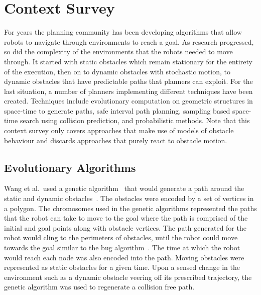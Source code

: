 


\chapter{Context Survey}

\label{chapter:contextsurvey}

For years the planning community has been developing algorithms that allow
robots to navigate through environments to reach a goal. As research
progressed, so did the complexity of the environments that the robots needed to
move through. It started with static obstacles which remain stationary for the
entirety of the execution, then on to dynamic obstacles with stochastic motion,
to dynamic obstacles that have predictable paths that planners can exploit. For
the last situation, a number of planners implementing different techniques have
been created. Techniques include evolutionary computation on geometric
structures in space-time to generate paths, safe interval path planning,
sampling based space-time search using collision prediction, and probabilistic
methods. Note that this context survey only covers approaches that make use of
models of obstacle behaviour and discards approaches that purely react to
obstacle motion.

\section{Evolutionary Algorithms}

Wang et al.\ used a genetic algorithm~\cite{galletly1992overview} that would
generate a path around the static and dynamic obstacles~\cite{wang2007mobile}.
The obstacles were encoded by a set of vertices in a polygon. The chromosomes
used in the genetic algorithms represented the paths that the robot can take to
move to the goal where the path is comprised of the initial and goal points
along with obstacle vertices.  The path generated for the robot would cling to
the perimeters of obstacles, until the robot could move towards the goal
similar to the bug algorithm~\cite{weir}. The time at which the robot would
reach each node was also encoded into the path. Moving obstacles were
represented as static obstacles for a given time. Upon a sensed change in the
environment such as a dynamic obstacle veering off its prescribed trajectory,
the genetic algorithm was used to regenerate a collision free path.

